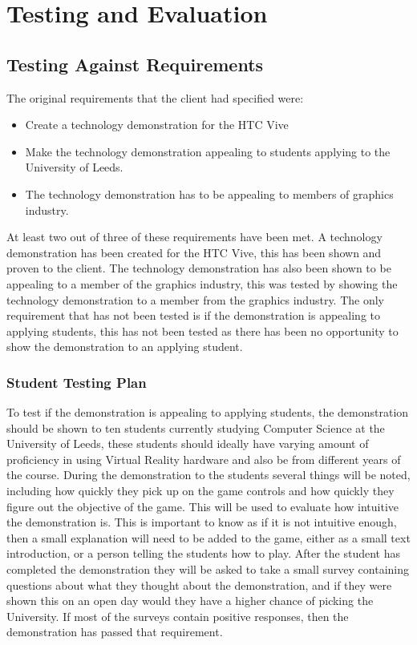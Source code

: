 \chapter{Testing and Evaluation}
\label{chapter7}

\section{Testing Against Requirements}
	The original requirements that the client had specified were:

\begin{itemize}
	\item Create a technology demonstration for the HTC Vive
	\item Make the technology demonstration appealing to students applying to the University of Leeds.
	\item The technology demonstration has to be appealing to members of graphics industry.
\end{itemize}

	At least two out of three of these requirements have been met. A technology demonstration has been created for the HTC Vive, this has been shown and proven to the client. The technology demonstration has also been shown to be appealing to a member of the graphics industry, this was tested by showing the technology demonstration to a member from the graphics industry. The only requirement that has not been tested is if the demonstration is appealing to applying students, this has not been tested as there has been no opportunity to show the demonstration to an applying student.

	\subsection{Student Testing Plan}
		To test if the demonstration is appealing to applying students, the demonstration should be shown to ten students currently studying Computer Science at the University of Leeds, these students should ideally have varying amount of proficiency in using Virtual Reality hardware and also be from different years of the course. During the demonstration to the students several things will be noted, including how quickly they pick up on the game controls and how quickly they figure out the objective of the game. This will be used to evaluate how intuitive the demonstration is. This is important to know as if it is not intuitive enough, then a small explanation will need to be added to the game, either as a small text introduction, or a person telling the students how to play. After the student has completed the demonstration they will be asked to take a small survey containing questions about what they thought about the demonstration, and if they were shown this on an open day would they have a higher chance of picking the University. If most of the surveys contain positive responses, then the demonstration has passed that requirement.

